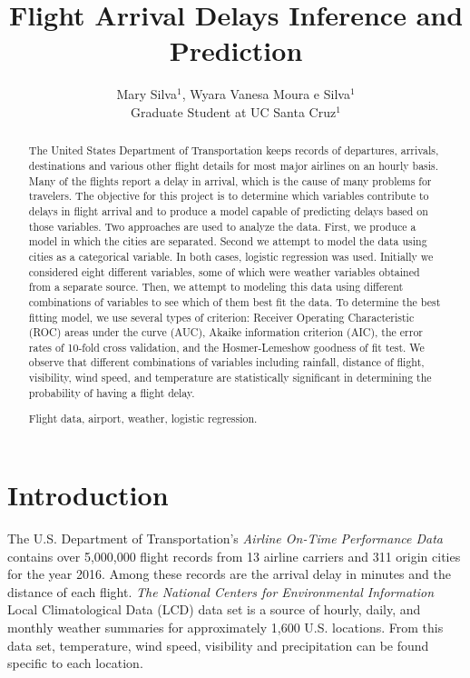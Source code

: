\documentclass{asaproc}
\title{Flight Arrival Delays Inference and Prediction}
\author{Mary Silva$^1$, Wyara Vanesa Moura e Silva$^1$\\
Graduate Student at UC Santa Cruz$^1$}
\begin{document}
\maketitle


\begin{abstract}

The United States Department of Transportation keeps records of departures, arrivals, destinations and various other flight details for most major airlines on an hourly basis. Many of the flights report a delay in arrival, which is the cause of many problems for travelers. The objective for this project is to determine which variables contribute to delays in flight arrival and to produce a model capable of predicting delays based on those variables. Two approaches are used to analyze the data. First, we produce a model in which the cities are separated. Second we attempt to model the data using cities as a categorical variable. In both cases, logistic regression was used. Initially we considered eight different variables, some of which were weather variables obtained from a separate source. Then, we attempt to modeling this data using different combinations of variables to see which of them best fit the data. To determine the best fitting model, we use several types of criterion: Receiver Operating Characteristic (ROC) areas under the curve (AUC), Akaike information criterion (AIC), the error rates of 10-fold cross validation, and the Hosmer-Lemeshow goodness of fit test. We observe that different combinations of variables including rainfall, distance of flight, visibility, wind speed, and temperature are statistically significant in determining the probability of having a flight delay.

\begin{keywords}
Flight data, airport, weather, logistic regression.

\end{keywords}


\end{abstract}


\section{Introduction}

The U.S. Department of Transportation's \textit{Airline On-Time Performance Data} \citeyearpar{USDT} contains over 5,000,000 flight records from 13 airline carriers and 311 origin cities for the year 2016. Among these records are the arrival delay in minutes and the distance of each flight. \textit{The National Centers for Environmental Information} \citeyearpar{NOAA} Local Climatological Data (LCD) data set is a source of hourly, daily, and monthly weather summaries for approximately 1,600 U.S. locations. From this data set, temperature, wind speed, visibility and precipitation can be found specific to each location.
\end{document}
